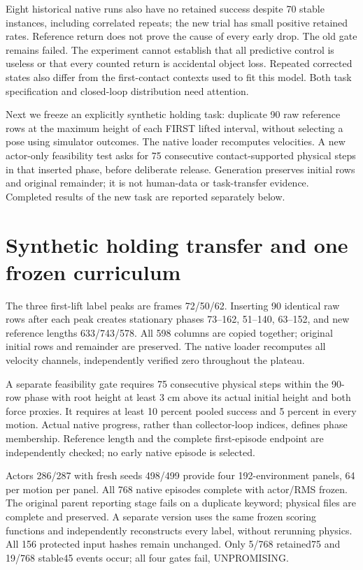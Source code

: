\documentclass[10pt]{article}
\begin{document}
Eight historical native runs also have no retained success despite 70 stable
instances, including correlated repeats; the new trial has small positive
retained rates. Reference return does not prove the cause of every early drop.
The old gate remains failed. The experiment cannot establish that all predictive
control is useless or that every counted return is accidental object loss.
Repeated corrected states also differ from the first-contact contexts used to
fit this model. Both task specification and closed-loop distribution need attention.

Next we freeze an explicitly synthetic holding task: duplicate 90 raw reference
rows at the maximum height of each FIRST lifted interval, without selecting a
pose using simulator outcomes. The native loader recomputes velocities. A new
actor-only feasibility test asks for 75 consecutive contact-supported physical
steps in that inserted phase, before deliberate release. Generation preserves
initial rows and original remainder; it is not human-data or task-transfer evidence.
Completed results of the new task are reported separately below.

\section{Synthetic holding transfer and one frozen curriculum}
The three first-lift label peaks are frames 72/50/62. Inserting 90 identical raw
rows after each peak creates stationary phases 73--162, 51--140, 63--152, and
new reference lengths 633/743/578. All 598 columns are copied together; original
initial rows and remainder are preserved. The native loader recomputes all
velocity channels, independently verified zero throughout the plateau.

A separate feasibility gate requires 75 consecutive physical steps within the
90-row phase with root height at least 3 cm above its actual initial height and
both force proxies. It requires at least 10 percent pooled success and 5 percent
in every motion. Actual native progress, rather than collector-loop indices,
defines phase membership. Reference length and the complete first-episode endpoint
are independently checked; no early native episode is selected.

Actors 286/287 with fresh seeds 498/499 provide four 192-environment panels, 64 per
motion per panel. All 768 native episodes complete with actor/RMS frozen.
The original parent reporting stage fails on a duplicate keyword; physical files
are complete and preserved. A separate version uses the same frozen scoring
functions and independently reconstructs every label, without rerunning physics.
All 156 protected input hashes remain unchanged. Only 5/768 retained75 and 19/768
stable45 events occur; all four gates fail, UNPROMISING.
\end{document}

